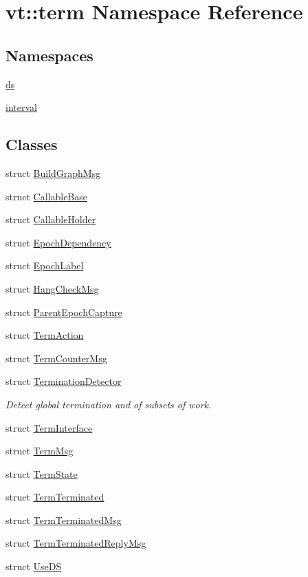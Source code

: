 \hypertarget{namespacevt_1_1term}{}\section{vt\+:\+:term Namespace Reference}
\label{namespacevt_1_1term}
\subsection*{Namespaces}
\begin{DoxyCompactItemize}
\item 
 \hyperlink{namespacevt_1_1term_1_1ds}{ds}
\item 
 \hyperlink{namespacevt_1_1term_1_1interval}{interval}
\end{DoxyCompactItemize}
\subsection*{Classes}
\begin{DoxyCompactItemize}
\item 
struct \hyperlink{structvt_1_1term_1_1_build_graph_msg}{Build\+Graph\+Msg}
\item 
struct \hyperlink{structvt_1_1term_1_1_callable_base}{Callable\+Base}
\item 
struct \hyperlink{structvt_1_1term_1_1_callable_holder}{Callable\+Holder}
\item 
struct \hyperlink{structvt_1_1term_1_1_epoch_dependency}{Epoch\+Dependency}
\item 
struct \hyperlink{structvt_1_1term_1_1_epoch_label}{Epoch\+Label}
\item 
struct \hyperlink{structvt_1_1term_1_1_hang_check_msg}{Hang\+Check\+Msg}
\item 
struct \hyperlink{structvt_1_1term_1_1_parent_epoch_capture}{Parent\+Epoch\+Capture}
\item 
struct \hyperlink{structvt_1_1term_1_1_term_action}{Term\+Action}
\item 
struct \hyperlink{structvt_1_1term_1_1_term_counter_msg}{Term\+Counter\+Msg}
\item 
struct \hyperlink{structvt_1_1term_1_1_termination_detector}{Termination\+Detector}
\begin{DoxyCompactList}\small\item\em Detect global termination and of subsets of work. \end{DoxyCompactList}\item 
struct \hyperlink{structvt_1_1term_1_1_term_interface}{Term\+Interface}
\item 
struct \hyperlink{structvt_1_1term_1_1_term_msg}{Term\+Msg}
\item 
struct \hyperlink{structvt_1_1term_1_1_term_state}{Term\+State}
\item 
struct \hyperlink{structvt_1_1term_1_1_term_terminated}{Term\+Terminated}
\item 
struct \hyperlink{structvt_1_1term_1_1_term_terminated_msg}{Term\+Terminated\+Msg}
\item 
struct \hyperlink{structvt_1_1term_1_1_term_terminated_reply_msg}{Term\+Terminated\+Reply\+Msg}
\item 
struct \hyperlink{structvt_1_1term_1_1_use_d_s}{Use\+DS}
\end{DoxyCompactItemize}
